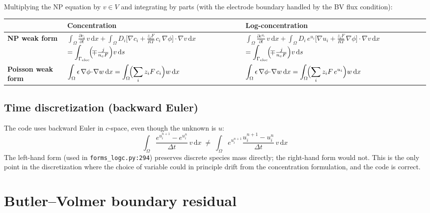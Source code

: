 \documentclass[11pt]{article}
\newcommand{\Gelec}{\Gamma_{\mathrm{elec}}}
\newcommand{\dx}{\,\mathrm{d}x}
\newcommand{\ds}{\,\mathrm{d}s}
\begin{document}
Multiplying the NP equation by $v\in V$ and integrating by parts (with the
electrode boundary handled by the BV flux condition):

\begin{center}
\renewcommand{\arraystretch}{1.5}
\begin{tabular}{@{} >{\bfseries}p{} p{} p{} @{}}
\toprule
& \textbf{Concentration} & \textbf{Log-concentration} \\
\midrule
NP weak form &
$\displaystyle\int_\Omega \frac{\partial c_i}{\partial t}\,v\dx
 + \int_\Omega D_i\bigl[\nabla c_i + \tfrac{z_i F}{RT}\,c_i\,\nabla\phi\bigr]\!\cdot\!\nabla v\dx$
\newline\hspace*{4em}$=\displaystyle\int_{\Gelec}\!\Bigl(\!\mp\tfrac{j}{n_e F}\Bigr) v\ds$ &
$\displaystyle\int_\Omega \frac{\partial e^{u_i}}{\partial t}\,v\dx
 + \int_\Omega D_i\,e^{u_i}\bigl[\nabla u_i + \tfrac{z_i F}{RT}\,\nabla\phi\bigr]\!\cdot\!\nabla v\dx$
\newline\hspace*{4em}$=\displaystyle\int_{\Gelec}\!\Bigl(\!\mp\tfrac{j}{n_e F}\Bigr) v\ds$ \\
\midrule
Poisson weak form &
$\displaystyle\int_\Omega \epsilon\,\nabla\phi\!\cdot\!\nabla w\dx
 = \int_\Omega\!\Bigl(\sum_i z_i F\,c_i\Bigr) w\dx$ &
$\displaystyle\int_\Omega \epsilon\,\nabla\phi\!\cdot\!\nabla w\dx
 = \int_\Omega\!\Bigl(\sum_i z_i F\,e^{u_i}\Bigr) w\dx$ \\
\bottomrule
\end{tabular}
\end{center}

\subsection{Time discretization (backward Euler)}
The code uses backward Euler in $c$-space, even though the unknown is $u$:
\[
  \boxed{\;
  \int_\Omega \frac{e^{u_i^{n+1}} - e^{u_i^{n}}}{\Delta t}\,v\dx
  \;\neq\;
  \int_\Omega e^{u_i^{n+1}}\frac{u_i^{n+1} - u_i^{n}}{\Delta t}\,v\dx
  \;}
\]
The left-hand form (used in \verb|forms_logc.py:294|) preserves discrete
species mass directly; the right-hand form would not. This is the only point
in the discretization where the choice of variable could in principle drift
from the concentration formulation, and the code is correct.

\section{Butler--Volmer boundary residual}
\end{document}
